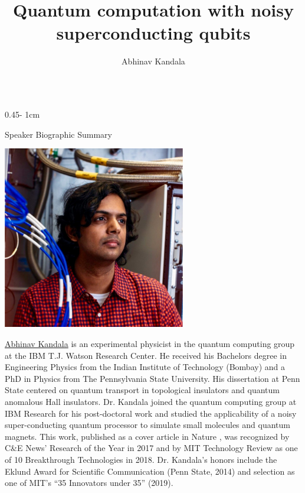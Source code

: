 \documentclass{../psuposter}
\title{Quantum computation with noisy superconducting qubits}
\author{Abhinav Kandala \inst{1}}
\institute{\inst{1} IBM T.J. Watson Research Center}
\begin{document}
\begin{frame}
\begin{columns}[t, totalwidth=\textwidth]
\begin{column}{0.45\textwidth - 1cm}


    \begin{block}{Speaker Biographic Summary}
    	\begin{center}
    		\includegraphics[width=0.6\textwidth]{images/kandala}
    	\end{center}
    	\href{https://researcher.watson.ibm.com/researcher/view.php?person=us-akandala}{Abhinav Kandala} is an experimental physicist in the quantum computing group at the IBM T.J. Watson Research Center. He received his Bachelors degree in Engineering Physics from the Indian Institute of Technology (Bombay) and a PhD in Physics from The Pennsylvania State University. His dissertation at Penn State centered on quantum transport in topological insulators and quantum anomalous Hall insulators. Dr. Kandala joined the quantum computing group at IBM Research for his post-doctoral work and  studied the applicability of a noisy super-conducting quantum processor to simulate small molecules and quantum magnets. This work, published as a cover article in Nature \cite{kandalaHardwareefficientVariationalQuantum2017}, was recognized by C\&E News’ Research of the Year in 2017 and by MIT Technology Review as one of 10 Breakthrough Technologies in 2018. Dr. Kandala’s honors include the Eklund Award for Scientific Communication (Penn State, 2014) and selection as one of MIT’s “35 Innovators under 35” (2019).
    \end{block}



\end{column}
\end{columns}
\end{frame}
\end{document}
